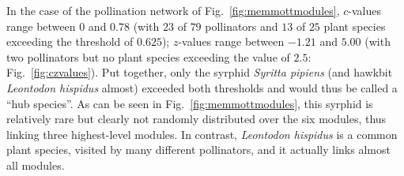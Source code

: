 \documentclass[a4paper, 11pt]{article}\usepackage[]{graphicx}\usepackage[dvipsnames]{xcolor}
\begin{document}
In the case of the pollination network of Fig.~\ref{fig:memmottmodules}, $c$-values range between $0$ and $0.78$ (with $23$ of $79$ pollinators and $13$ of $25$ plant species exceeding the threshold of $0.625$); $z$-values range between $-1.21$ and $5.00$ (with two pollinators but no plant species exceeding the value of $2.5$: Fig.~\ref{fig:czvalues}). Put together, only the syrphid \emph{Syritta pipiens} (and hawkbit \emph{Leontodon hispidus} almost) exceeded both thresholds and would thus be called a ``hub species''. As can be seen in Fig.~\ref{fig:memmottmodules}, this syrphid is relatively rare but clearly not randomly distributed over the six modules, thus linking three highest-level modules. In contrast, \emph{Leontodon hispidus} is a common plant species, visited by many different pollinators, and it actually links almost all modules. 
\end{document}
